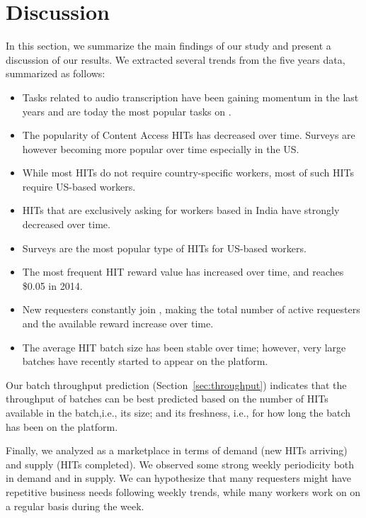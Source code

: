 \section{Discussion}
\label{sec:discuss}

In this section, we summarize the main findings of our study and present a discussion of our results. We  extracted several trends from the five years data, summarized as follows:
\begin{itemize}[noitemsep,topsep=0pt,parsep=0pt,partopsep=0pt]
	\item Tasks related to audio transcription have been gaining momentum in the last years and are today the most popular tasks on \amt{}.
	\item The popularity of Content Access HITs has decreased over time. Surveys are however becoming more popular over time especially in the US.
	\item While most HITs do not require country-specific workers, most of such HITs require US-based workers.
	\item HITs that are exclusively asking for workers based in India have strongly decreased over time.
	\item Surveys are the most popular type of HITs for US-based workers.
	\item The most frequent HIT reward value has increased over time, and reaches \$0.05 in 2014.
	\item New requesters constantly join \amt{}, making the total number of active requesters and the available reward increase over time.
	\item The average HIT batch size has been stable over time; however, very large batches have recently started to appear on the platform.
\end{itemize}

Our batch throughput prediction (Section~\ref{sec:throughput}) indicates that the throughput of batches can be best predicted based on the number of HITs available in the batch,i.e., its size; and its freshness, i.e., for how long the batch has been on the platform.

Finally, we analyzed \amt{} as a marketplace in terms of demand (new HITs arriving) and supply (HITs completed). 
We observed some strong weekly periodicity both in demand and in supply. We can hypothesize that many requesters might have repetitive business needs following weekly trends, while many workers work on \amt{} on a regular basis during the week.